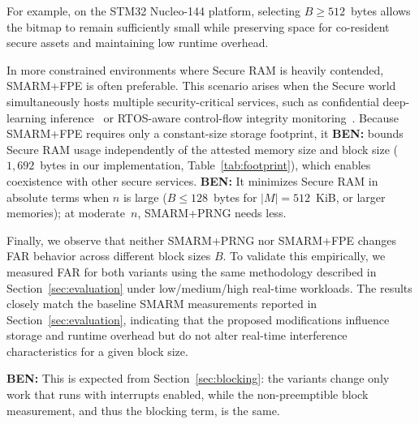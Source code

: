 \documentclass{ieeeaccess}
\DeclareRobustCommand{\ben}[1]{{\color{BENcolor}\textbf{BEN:} #1}}
\newcommand{\rtsmarmone}{SMARM+PRNG\xspace}
\newcommand{\rtsmarmtwo}{SMARM+FPE\xspace}
\begin{document}
For example, on the STM32 Nucleo-144 platform, selecting $B \geq 512$~bytes allows the bitmap to remain sufficiently small while preserving space for co-resident secure assets and maintaining low runtime overhead.

In more constrained environments where Secure RAM is heavily contended, \rtsmarmtwo is often preferable.
This scenario arises when the Secure world simultaneously hosts multiple security-critical services, such as confidential deep-learning inference~\cite{tslices} or RTOS-aware control-flow integrity monitoring~\cite{tzmcfi}.
Because \rtsmarmtwo requires only a constant-size storage footprint, it \ben{bounds Secure RAM usage independently of the attested memory size and block size ($1{,}692$~bytes in our implementation, Table~\ref{tab:footprint}), which} enables coexistence with other secure services.
\ben{It minimizes Secure RAM in absolute terms when $n$ is large ($B \le 128$~bytes for $|M| = 512$~KiB, or larger memories); at moderate~$n$, \rtsmarmone needs less.}


Finally, we observe that neither \rtsmarmone nor \rtsmarmtwo changes FAR behavior across different block sizes $B$.
To validate this empirically, we measured FAR for both variants using the same methodology described in Section~\ref{sec:evaluation} under low/medium/high real-time workloads.
The results closely match the baseline SMARM measurements reported in Section~\ref{sec:evaluation}, indicating that the proposed modifications influence storage and runtime overhead but do not alter real-time interference characteristics for a given block size.

\ben{This is expected from Section~\ref{sec:blocking}: the variants change only work that runs with interrupts enabled, while the non-preemptible block measurement, and thus the blocking term, is the same.}
\end{document}

